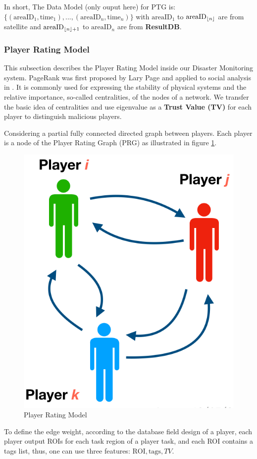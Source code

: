 In short, The Data Model (only ouput here) for PTG is:
$\{(\text{areaID}_1, \text{time}_1), ..., (\text{areaID}_n, \text{time}_n)\}$
with $\text{areaID}_1$ to $\text{areaID}_{\lfloor n\rfloor}$ are from satellite and 
$\text{areaID}_{\lfloor n\rfloor+1}$ to $\text{areaID}_{n}$ are from \textbf{ResultDB}.

\subsubsection{Player Rating Model}

This subsection describes the Player Rating Model inside our Disaster Monitoring system.
PageRank was first proposed by Lary Page \cite{page1999pagerank} and applied to social analysis in \cite{bonacich2001eigenvector}. 
It is commonly used for expressing the stability of physical systems and the relative importance, 
so-called centralities, of the nodes of a network. We transfer the basic idea of centralities 
and use eigenvalue as a \textbf{Trust Value (TV)} for each player to distinguish malicious players.

Considering a partial fully connected directed graph between players. 
Each player is a node of the Player Rating Graph (PRG) as illustrated in figure \ref{fig:graph}.

\begin{figure}[htp]
\centering
\includegraphics[width=0.3\columnwidth]{figures/graph}
\caption{Player Rating Model}
\label{fig:graph}
\end{figure}

To define the edge weight, according to the database field design of a player, each player
output ROIs for each task region of a player task, and each ROI contains a tags list, thus, 
one can use three features: $\text{ROI}, \text{tags}, TV$.

